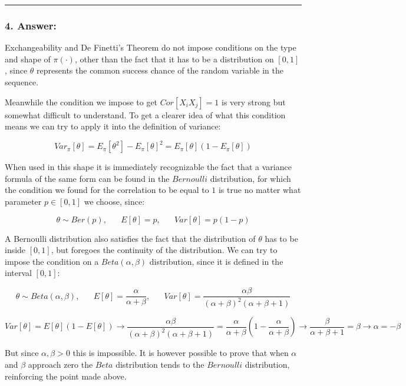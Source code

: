 \documentclass[
]{article}
\begin{document}
\begin{center}\rule{0.5\linewidth}{0.5pt}\end{center}

\hypertarget{answer-13}{%
\subsubsection{4. Answer:}\label{answer-13}}

Exchangeability and De Finetti's Theorem do not impose conditions on the
type and shape of \(\pi(\cdot)\), other than the fact that it has to be
a distribution on \([0, 1]\), since \(\theta\) represents the common
success chance of the random variable in the sequence.

Meanwhile the condition we impose to get \(Cor[X_i X_j] = 1\) is very
strong but somewhat difficult to understand. To get a clearer idea of
what this condition means we can try to apply it into the definition of
variance:

\[
Var_\pi[\theta] =
E_\pi[\theta^2] - E_\pi[\theta]^2 =
E_\pi[\theta](1-E_\pi[\theta])
\]

When used in this shape it is immediately recognizable the fact that a
variance formula of the same form can be found in the \(Bernoulli\)
distribution, for which the condition we found for the correlation to be
equal to \(1\) is true no matter what parameter \(p \in [0,1]\) we
choose, since:

\[
\theta \sim Ber(p), \;\;\;\;\;\;
E[\theta] = p, \;\;\;\;\;\;
Var[\theta]=p(1-p)
\]

A Bernoulli distribution also satisfies the fact that the distribution
of \(\theta\) has to be inside \([0, 1]\), but foregoes the continuity
of the distribution. We can try to impose the condition on a
\(Beta(\alpha, \beta)\) distribution, since it is defined in the
interval \([0, 1]\):

\[
\theta \sim Beta(\alpha, \beta), \;\;\;\;\;\;
E[\theta] = \frac{\alpha}{\alpha + \beta}, \;\;\;\;\;\;
Var[\theta] = \frac{\alpha\beta}{(\alpha+\beta)^2(\alpha+\beta+1)}
\]

\[
Var[\theta] = E[\theta](1-E[\theta]) \rightarrow
\frac{\alpha\beta}{(\alpha+\beta)^2(\alpha+\beta+1)} =
\frac{\alpha}{\alpha + \beta} \left( 1 - \frac{\alpha}{\alpha + \beta}\right) \rightarrow
\frac{\beta}{\alpha+\beta+1} =
\beta \rightarrow
\alpha = - \beta
\]

But since \(\alpha, \beta > 0\) this is impossible. It is however
possible to prove that when \(\alpha\) and \(\beta\) approach zero the
\(Beta\) distribution tends to the \(Bernoulli\) distribution,
reinforcing the point made above.
\end{document}

